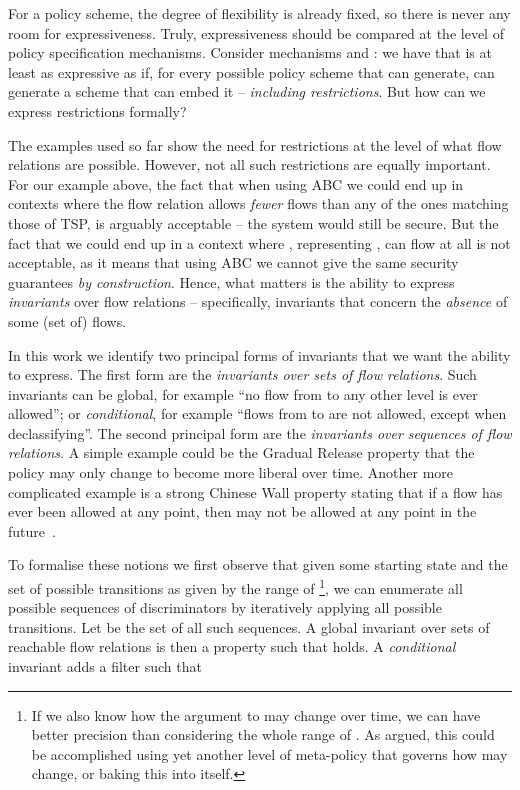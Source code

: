 For a policy scheme, the degree of flexibility is already fixed, so there is never any room
for expressiveness. Truly, expressiveness should be compared at the level of policy specification
mechanisms. Consider mechanisms  and : we have that  is at least as expressive as 
 if, for every possible policy scheme that  can generate,  can generate a scheme that
can embed it -- \emph{including restrictions}. But how can we express restrictions formally?

The examples used so far show the need for restrictions at the level of what flow relations are
possible. However, not all such restrictions are equally important. For our example above, the
fact that when using ABC we could end up in contexts where the flow relation allows \emph{fewer}
flows than any of the ones matching those of TSP, is arguably acceptable -- the system would
still be secure. But the fact that we could end up in a context where , representing ,
can flow at all is not acceptable, as it means that using ABC we cannot give the same security
guarantees \emph{by construction}. Hence, what matters is the ability to express
\emph{invariants} over flow relations -- specifically, invariants that concern the \emph{absence}
of some (set of) flows.

In this work we identify two principal forms of invariants that we want the ability to express.
The first form are the \emph{invariants over sets of flow relations}. Such invariants can be
global, for example ``no flow from  to any other level is ever allowed'';
or \emph{conditional}, for example ``flows from  to  are not
allowed, except when declassifying''. The second principal form are the
\emph{invariants over sequences of flow relations}. A simple example could be the
Gradual Release property \cite{Askarov:Sabelfeld:Gradual} that the policy may only
change to become more liberal over time. Another more complicated example is a strong
Chinese Wall property stating that if a flow  has ever
been allowed at any point, then  may not be allowed at
any point in the future~\cite{brewer1989chinese}. 

To formalise these notions we first observe that given some starting state  and the set of possible
transitions as given by the range of \footnote{If we also know how the argument  to  may change
over time, we can have better precision than considering the whole range of . As argued, this could
be accomplished using yet another level of meta-policy that governs how  may change, or baking this into
 itself.}, we can enumerate all possible sequences
of discriminators by iteratively applying all possible transitions. Let 
be the set of all such sequences. A global invariant over sets of reachable flow relations is then a property 
such that 
 holds. A \emph{conditional} invariant adds a filter  such that

